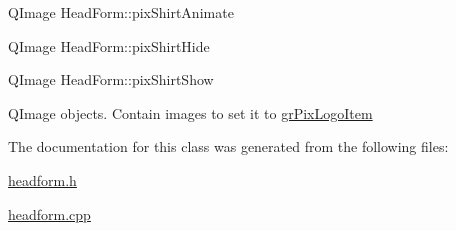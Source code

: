\begin{DoxyCompactItemize}
\item\mbox{\label{classHeadForm_aa44a452750fe6db786814ec502f0d655}} 
{\footnotesize\ttfamily Q\+Image Head\+Form\+::\texorpdfstring{pix\+Shirt\+Animate}{pixShirtAnimate}{\ttfamily [private]}} 

\item\mbox{\label{classHeadForm_a54d7609f912aa7b0edd6850e1f57f0a0}} 
{\footnotesize\ttfamily Q\+Image Head\+Form\+::\texorpdfstring{pix\+Shirt\+Hide}{pixShirtHide}{\ttfamily [private]}}

\item\mbox{\label{classHeadForm_a30f30561d242211ed827ffaf627e0839}} 
{\footnotesize\ttfamily Q\+Image Head\+Form\+::\texorpdfstring{pix\+Shirt\+Show}{pixShirtShow}{\ttfamily [private]}}

Q\+Image objects. Contain images to set it to \hyperlink{classHeadForm_a974e25ac4edb0f0a25da108c0b4da4a1}{gr\+Pix\+Logo\+Item}
\end{DoxyCompactItemize}

The documentation for this class was generated from the following files\+:\begin{DoxyCompactItemize}
\item 
\mbox{\hyperlink{headform_8h}{headform.\+h}}\item 
\mbox{\hyperlink{headform_8cpp}{headform.\+cpp}}\end{DoxyCompactItemize}
\newpage